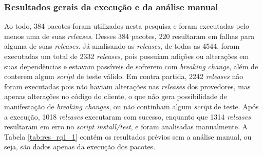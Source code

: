 \subsubsection{Resultados gerais da execução e da análise manual}


Ao todo, 384 pacotes foram utilizados nesta pesquisa e foram executadas pelo menos uma de suas \textit{releases}. Desses 384 pacotes, 220 resultaram em falhas para alguma de suas \textit{releases}. Já analisando as \textit{releases}, de todas as 4544, foram executadas um total de 2332 \textit{releases}, pois possuíam adições ou alterações em suas dependências e estavam passíveis de sofrerem com \textit{breaking change}, além de conterem algum \textit{script} de teste válido. Em contra partida, 2242 \textit{releases} não foram executadas pois não haviam alterações nas \textit{releases} dos provedores, mas apenas alterações no código do cliente, o que não gera possibilidade de manifestação de \textit{breaking changes}, ou não continham algum \textit{script} de teste. Após a execução, 1018 \textit{releases} executaram com sucesso, enquanto que 1314 \textit{releases} resultaram em erro no \textit{script install/test}, e foram analisadas manualmente. A Tabela \ref{tab:res_rq1_1} contém os resultados prévios sem a análise manual, ou seja, são dados apenas da execução dos pacotes.

